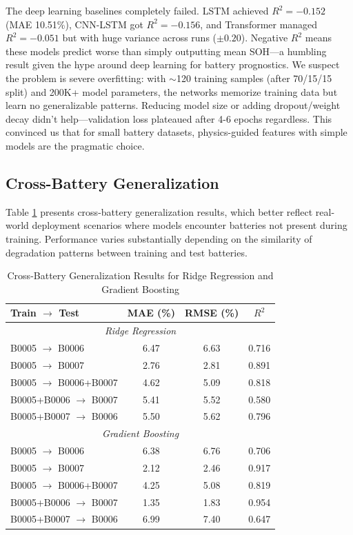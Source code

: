 \documentclass{sn-jnl}
\begin{document}
The deep learning baselines completely failed. LSTM achieved $R^2 = -0.152$ (MAE 10.51\%), CNN-LSTM got $R^2 = -0.156$, and Transformer managed $R^2 = -0.051$ but with huge variance across runs ($\pm 0.20$). Negative $R^2$ means these models predict worse than simply outputting mean SOH—a humbling result given the hype around deep learning for battery prognostics. We suspect the problem is severe overfitting: with $\sim$120 training samples (after 70/15/15 split) and 200K+ model parameters, the networks memorize training data but learn no generalizable patterns. Reducing model size or adding dropout/weight decay didn't help—validation loss plateaued after 4-6 epochs regardless. This convinced us that for small battery datasets, physics-guided features with simple models are the pragmatic choice.

\subsection{Cross-Battery Generalization}
\label{subsec:cross_battery}

Table \ref{tab:crossbattery} presents cross-battery generalization results, which better reflect real-world deployment scenarios where models encounter batteries not present during training. Performance varies substantially depending on the similarity of degradation patterns between training and test batteries.

\begin{table}[htbp]
\caption{Cross-Battery Generalization Results for Ridge Regression and Gradient Boosting}
\label{tab:crossbattery}
\centering
\small
\begin{tabular}{lccc}
\toprule
\textbf{Train $\rightarrow$ Test} & \textbf{MAE (\%)} & \textbf{RMSE (\%)} & \textbf{$R^2$} \\
\midrule
\multicolumn{4}{c}{\textit{Ridge Regression}} \\
\midrule
B0005 $\rightarrow$ B0006 & 6.47 & 6.63 & 0.716 \\
B0005 $\rightarrow$ B0007 & 2.76 & 2.81 & 0.891 \\
B0005 $\rightarrow$ B0006+B0007 & 4.62 & 5.09 & 0.818 \\
B0005+B0006 $\rightarrow$ B0007 & 5.41 & 5.52 & 0.580 \\
B0005+B0007 $\rightarrow$ B0006 & 5.50 & 5.62 & 0.796 \\
\midrule
\multicolumn{4}{c}{\textit{Gradient Boosting}} \\
\midrule
B0005 $\rightarrow$ B0006 & 6.38 & 6.76 & 0.706 \\
B0005 $\rightarrow$ B0007 & 2.12 & 2.46 & 0.917 \\
B0005 $\rightarrow$ B0006+B0007 & 4.25 & 5.08 & 0.819 \\
B0005+B0006 $\rightarrow$ B0007 & 1.35 & 1.83 & 0.954 \\
B0005+B0007 $\rightarrow$ B0006 & 6.99 & 7.40 & 0.647 \\
\bottomrule
\end{tabular}
\end{table}
\end{document}
